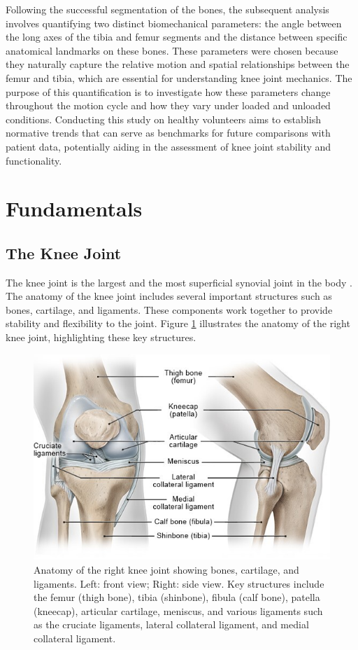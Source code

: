 \documentclass{micro-econ-thesis}
\begin{document}
Following the successful segmentation of the bones, the subsequent analysis involves quantifying two distinct biomechanical parameters: the angle between the long axes of the tibia and femur segments and the distance between specific anatomical landmarks on these bones. These parameters were chosen because they naturally capture the relative motion and spatial relationships between the femur and tibia, which are essential for understanding knee joint mechanics. The purpose of this quantification is to investigate how these parameters change throughout the motion cycle and how they vary under loaded and unloaded conditions. Conducting this study on healthy volunteers aims to establish normative trends that can serve as benchmarks for future comparisons with patient data, potentially aiding in the assessment of knee joint stability and functionality. 

\section{Fundamentals}
\label{sec:intro}


\subsection{The Knee Joint }

The knee joint is the largest and the most superficial synovial joint in the body \parencite{dalley_moores_2023}. The anatomy of the knee joint includes several important structures such as bones, cartilage, and ligaments. These components work together to provide stability and flexibility to the joint. Figure \ref{fig:kniearthrosekniegelenk-anatomieenjpg} illustrates the anatomy of the right knee joint, highlighting these key structures.
\begin{figure}[H]
	\centering
	\includegraphics[width=0.7\linewidth]{kniearthrose_kniegelenk-anatomie_enjpg}
	\caption{Anatomy of the right knee joint showing bones, cartilage, and ligaments. Left: front view; Right: side view. Key structures include the femur (thigh bone), tibia (shinbone), fibula (calf bone), patella (kneecap), articular cartilage, meniscus, and various ligaments such as the cruciate ligaments, lateral collateral ligament, and medial collateral ligament. \parencite{informedhealth2021}}
	\label{fig:kniearthrosekniegelenk-anatomieenjpg}
\end{figure}
\end{document}
